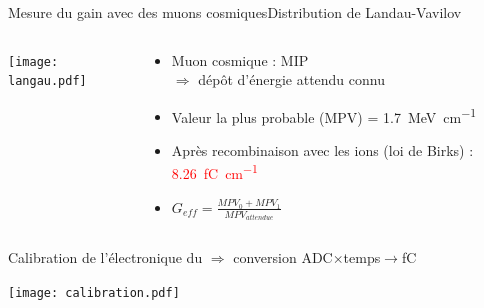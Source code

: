     \begin{frame}{Mesure du gain avec des muons cosmiques}{Distribution de Landau-Vavilov}
       	\begin{scriptsize}
            \begin{columns}
                \begin{column}{0.6\textwidth}
                    \centering \texttt{[image: langau.pdf]}
                \end{column}\hfill
                \begin{column}{0.4\textwidth}
                    \begin{itemize}
          					\item Muon cosmique : MIP \\ $\Rightarrow$ dépôt d'énergie attendu connu
          					\item Valeur la plus probable (MPV) = \SI{1.7}{\mega\electronvolt\per\centi\meter}
          					\item Après recombinaison avec les ions (loi de Birks) : \textcolor{red}{\SI{8.26}{\femto\coulomb\per\centi\meter}}
          					\item $G_{eff}=\frac{MPV_0 + MPV_1}{MPV_{attendue}}$
          				\end{itemize}
                \end{column}
            \end{columns}
            \vspace{0.2cm}
            Calibration de l'électronique du \TOO{} $\Rightarrow$ conversion ADC$\times$temps$\to$\si{\femto\coulomb}
            \begin{center} \texttt{[image: calibration.pdf]} \end{center}
	    \end{scriptsize}
    \end{frame}

